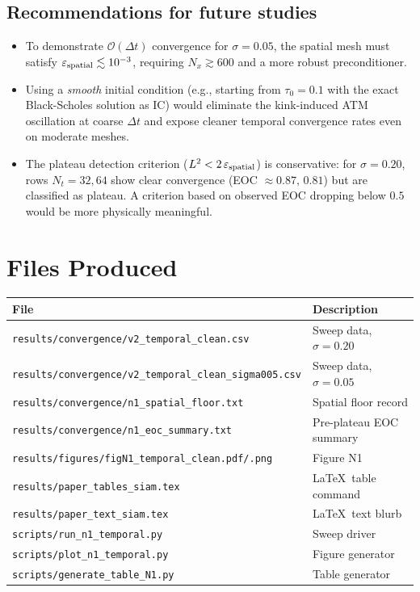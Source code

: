 \documentclass[11pt,a4paper]{article}
\newcommand{\Nx}{N_x}
\newcommand{\Nt}{N_t}
\newcommand{\dt}{\Delta t}
\newcommand{\bigo}[1]{\mathcal{O}(#1)}
\newcommand{\eps}{\varepsilon}
\begin{document}
\subsection{Recommendations for future studies}

\begin{itemize}[noitemsep]
\item To demonstrate $\bigo{\dt}$ convergence for $\sigma=0.05$,
  the spatial mesh must satisfy
  $\eps_{\rm spatial} \lesssim 10^{-3}$, requiring
  $\Nx \gtrsim 600$ and a more robust preconditioner.
\item Using a \emph{smooth} initial condition (e.g., starting from
  $\tau_0 = 0.1$ with the exact Black-Scholes solution as IC)
  would eliminate the kink-induced ATM oscillation at coarse $\dt$
  and expose cleaner temporal convergence rates even on moderate meshes.
\item The plateau detection criterion ($L^2 < 2\,\eps_{\rm spatial}$)
  is conservative: for $\sigma=0.20$, rows $\Nt=32,64$ show
  clear convergence (EOC $\approx 0.87,\,0.81$) but are
  classified as plateau.  A criterion based on observed EOC
  dropping below $0.5$ would be more physically meaningful.
\end{itemize}

\section{Files Produced}

\begin{center}
\begin{tabular}{ll}
\toprule
File & Description \\
\midrule
\texttt{results/convergence/v2\_temporal\_clean.csv}        & Sweep data, $\sigma=0.20$ \\
\texttt{results/convergence/v2\_temporal\_clean\_sigma005.csv} & Sweep data, $\sigma=0.05$ \\
\texttt{results/convergence/n1\_spatial\_floor.txt}         & Spatial floor record \\
\texttt{results/convergence/n1\_eoc\_summary.txt}            & Pre-plateau EOC summary \\
\texttt{results/figures/figN1\_temporal\_clean.pdf/.png}    & Figure N1 \\
\texttt{results/paper\_tables\_siam.tex}                     & \LaTeX\ table command \\
\texttt{results/paper\_text\_siam.tex}                       & \LaTeX\ text blurb \\
\texttt{scripts/run\_n1\_temporal.py}                        & Sweep driver \\
\texttt{scripts/plot\_n1\_temporal.py}                       & Figure generator \\
\texttt{scripts/generate\_table\_N1.py}                     & Table generator \\
\bottomrule
\end{tabular}
\end{center}
\end{document}
